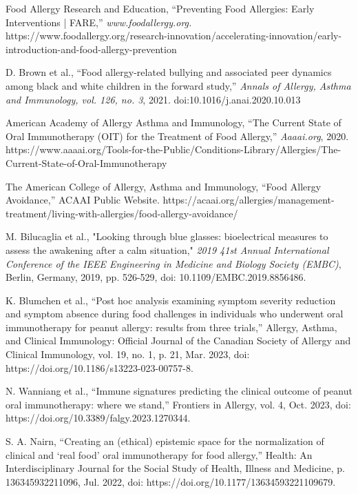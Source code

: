 \begin{thebibliography}{100}
    Food Allergy Research and Education, “Preventing Food Allergies: Early Interventions | FARE,” \textit{www.foodallergy.org.} https://www.foodallergy.org/research-innovation/accelerating-innovation/early-introduction-and-food-allergy-prevention
    
     D. Brown et al., “Food allergy-related bullying and associated peer dynamics among black and white children in the forward study,” \textit{Annals of Allergy, Asthma and Immunology, vol. 126, no. 3}, 2021. doi:10.1016/j.anai.2020.10.013
    
     American Academy of Allergy Asthma and Immunology, “The Current State of Oral Immunotherapy (OIT) for the Treatment of Food Allergy,” \textit{Aaaai.org}, 2020. https://www.aaaai.org/Tools-for-the-Public/Conditions-Library/Allergies/The-Current-State-of-Oral-Immunotherapy 

     The American College of Allergy, Asthma and Immunology, “Food Allergy Avoidance,” ACAAI Public Website. https://acaai.org/allergies/management-treatment/living-with-allergies/food-allergy-avoidance/

     M. Bilucaglia et al., "Looking through blue glasses: bioelectrical measures to assess the awakening after a calm situation," \textit{2019 41st Annual International Conference of the IEEE Engineering in Medicine and Biology Society (EMBC)}, Berlin, Germany, 2019, pp. 526-529, doi: 10.1109/EMBC.2019.8856486.

     K. Blumchen et al., “Post hoc analysis examining symptom severity reduction and symptom absence during food challenges in individuals who underwent oral immunotherapy for peanut allergy: results from three trials,” Allergy, Asthma, and Clinical Immunology: Official Journal of the Canadian Society of Allergy and Clinical Immunology, vol. 19, no. 1, p. 21, Mar. 2023, doi: https://doi.org/10.1186/s13223-023-00757-8.

     N. Wanniang et al., “Immune signatures predicting the clinical outcome of peanut oral immunotherapy: where we stand,” Frontiers in Allergy, vol. 4, Oct. 2023, doi: https://doi.org/10.3389/falgy.2023.1270344.

     S. A. Nairn, “Creating an (ethical) epistemic space for the normalization of clinical and ‘real food’ oral immunotherapy for food allergy,” Health: An Interdisciplinary Journal for the Social Study of Health, Illness and Medicine, p. 136345932211096, Jul. 2022, doi: https://doi.org/10.1177/13634593221109679.


\end{thebibliography}
